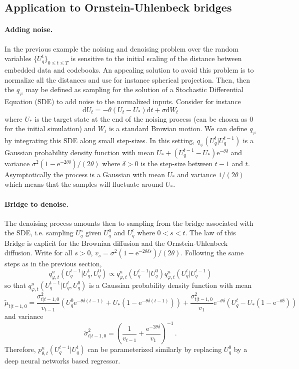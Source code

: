 \documentclass{article}
\begin{document}
\subsection{Application to Ornstein-Uhlenbeck bridges}
\paragraph{Adding noise. }
In the previous example the noising and denoising problem over the random variables $\{U_q^t\}_{0\leqslant t\leqslant T}$ is sensitive to the initial scaling of the distance between embedded data and codebooks. An appealing solution to avoid this problem is to normalize all the distances and use for instance spherical projection. Then, then the $q_\varphi$ may  be defined as sampling for the solution of a Stochastic Differential Equation (SDE) to add noise to the  normalized inputs. Consider for instance
$$
\mathrm{d}U_t = -\theta (U_t - U_*)\mathrm{d}t + \sigma\mathrm{d}W_t
$$
where $U_*$ is the target state at the end of the noising process (can be chosen as 0 for the initial simulation) and $W_t$ is a standard Browian motion. We can define $q_\varphi$ by integrating this SDE along small step-sizes. In this setting, $q_\varphi(U_q^{t}|U_q^{t-1})$ is a Gaussian probability density function with mean $U_* + (U_q^{t-1}-U_*)\mathrm{e}^{-\theta \delta}$ and variance $\sigma^2(1-\mathrm{e}^{-2\theta\delta})/(2\theta)$ where $\delta>0$ is the step-size between $t-1$ and $t$. Asymptotically the process is a Gaussian with mean $U_*$ and variance $1/(2\theta)$ which means that the samples will fluctuate around $U_*$.

\paragraph{Bridge to denoise. }
The denoising process amounts then to sampling from the bridge associated with the SDE, i.e. sampling $U_q^s$ given $U_q^0$ and $U_q^t$ where $0<s<t$. The law of this Bridge is explicit for the Brownian diffusion and the Ornstein-Uhlenbeck diffusion. Write for all $s>0$, $v_s = \sigma^2(1-\mathrm{e}^{-2\theta\delta s})/(2\theta)$.
Following the same steps as in the previous section,
$$
q^u_{\varphi,t}(U_q^{t-1}|U_q^{t},U_q^{0}) \propto q^u_{\varphi,t}(U_q^{t-1}|U_q^{0}) q^u_{\varphi,t}(U_q^{t}|U_q^{t-1})
$$
so that $q^u_{\varphi,t}(U_q^{t-1}|U_q^{t},U_q^{0})$ is a Gaussian probability density function with mean
$$
\tilde \mu_{t|t-1,0} = \frac{\sigma^2_{t|t-1,0}}{v_{t-1}}\left(U_q^0\mathrm{e}^{-\theta\delta(t-1)} +U_*(1-\mathrm{e}^{-\theta\delta(t-1)})\right) + \frac{\sigma^2_{t|t-1,0}}{v_{1}}\mathrm{e}^{-\theta\delta}\left(U_q^t - U_*(1 - \mathrm{e}^{-\theta\delta} )\right)
$$
and variance
$$
\tilde \sigma^2_{t|t-1,0} = \left(\frac{1}{v_{t-1}} + \frac{\mathrm{e}^{-2\theta\delta}}{v_1}\right)^{-1}\,.
$$
 Therefore, $p^u_{\theta,t}(U_q^{t-1}|U_q^t)$ can be parameterized similarly by replacing $U_q^0$ by a deep neural networks based regressor.
\end{document}

